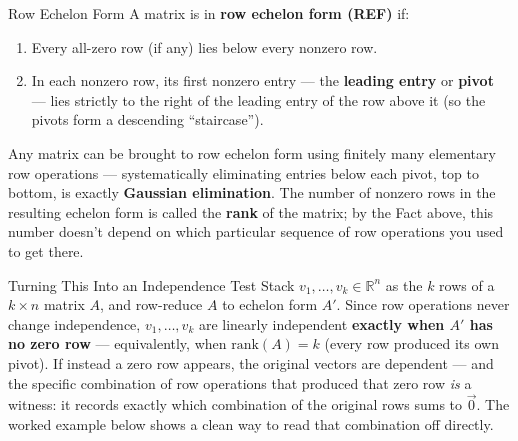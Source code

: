 \begin{defbox}{Row Echelon Form}
A matrix is in \textbf{row echelon form (REF)} if:
\begin{enumerate}[leftmargin=*, label=(\arabic*)]
  \item Every all-zero row (if any) lies below every nonzero row.
  \item In each nonzero row, its first nonzero entry --- the \textbf{leading entry} or \textbf{pivot} --- lies strictly to the right of the leading entry of the row above it (so the pivots form a descending ``staircase'').
\end{enumerate}
Any matrix can be brought to row echelon form using finitely many elementary row operations --- systematically eliminating entries below each pivot, top to bottom, is exactly \textbf{Gaussian elimination}. The number of nonzero rows in the resulting echelon form is called the \textbf{rank} of the matrix; by the Fact above, this number doesn't depend on which particular sequence of row operations you used to get there.
\end{defbox}

\begin{rmkbox}{Turning This Into an Independence Test}
Stack $v_1,\ldots,v_k \in \mathbb{R}^n$ as the $k$ rows of a $k \times n$ matrix $A$, and row-reduce $A$ to echelon form $A'$. Since row operations never change independence, $v_1,\ldots,v_k$ are linearly independent \textbf{exactly when $A'$ has no zero row} --- equivalently, when $\mathrm{rank}(A) = k$ (every row produced its own pivot). If instead a zero row appears, the original vectors are dependent --- and the specific combination of row operations that produced that zero row \emph{is} a witness: it records exactly which combination of the original rows sums to $\vec 0$. The worked example below shows a clean way to read that combination off directly.
\end{rmkbox}

